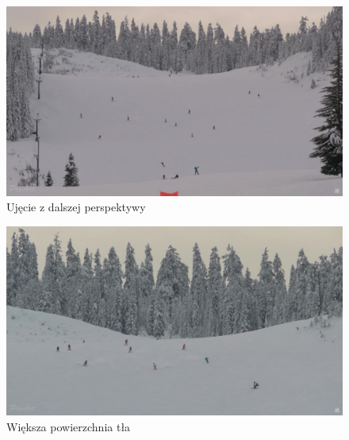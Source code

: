 \documentclass[a4paper]{article}
\begin{document}
\begin{figure}[H]
  \includegraphics[width=\linewidth]{resources/img2.png}
  \caption{Ujęcie z dalszej perspektywy}
\end{figure}
\begin{figure}[H]
  \includegraphics[width=\linewidth]{resources/img3.png}
  \caption{Większa powierzchnia tła}
\end{figure}
\end{document}
